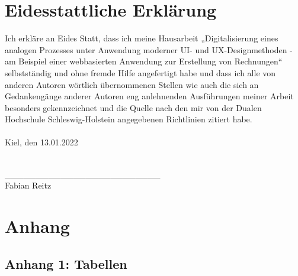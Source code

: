 \documentclass[a4paper]{scrartcl}
\begin{document}

\printbibliography[heading=none]


\section*{Eidesstattliche Erklärung}


\onehalfspacing

Ich erkläre an Eides Statt, dass ich meine Hausarbeit „Digitalisierung eines analogen Prozesses unter Anwendung moderner UI- und UX-Designmethoden - am Beispiel einer webbasierten Anwendung zur Erstellung von Rechnungen“ selbstständig und ohne fremde Hilfe angefertigt habe und dass ich alle von anderen Autoren wörtlich übernommenen Stellen wie auch die sich an Gedankengänge anderer Autoren eng anlehnenden Ausführungen meiner Arbeit besonders gekennzeichnet und die Quelle nach den mir von der Dualen Hochschule Schleswig-Holstein angegebenen Richtlinien zitiert habe. \\ \\

Kiel, den 13.01.2022 \\ \\ 

\begin{tabbing}
	\_\_\_\_\_\_\_\_\_\_\_\_\_\_\_\_\_\_\_\_\_\_\_\_\_ \\
	Fabian Reitz
\end{tabbing}


\newpage

\appendix

\section*{Anhang}

\subsection*{Anhang 1: Tabellen}
\end{document}
